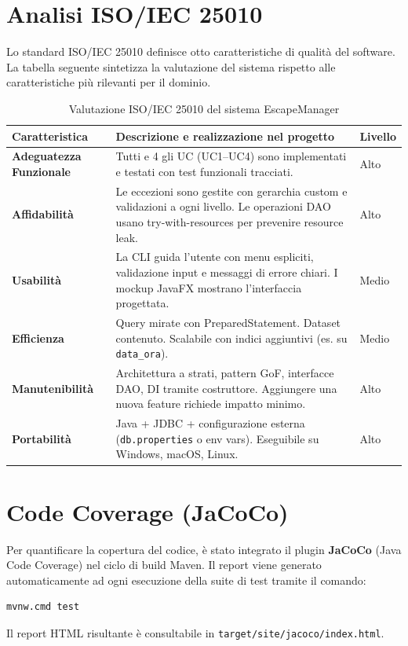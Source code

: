 \section{Analisi ISO/IEC 25010}
Lo standard ISO/IEC 25010 definisce otto caratteristiche di qualità del software. La tabella seguente sintetizza la valutazione del sistema rispetto alle caratteristiche più rilevanti per il dominio.

\begin{table}[H]
    \centering
    \small
    \renewcommand{\arraystretch}{1.3}
    \begin{tabularx}{\textwidth}{|>{\bfseries}l|X|>{\centering\arraybackslash}p{2cm}|}
        \hline
        Caratteristica & Descrizione e realizzazione nel progetto & Livello \\
        \hline
        Adeguatezza Funzionale & Tutti e 4 gli UC (UC1--UC4) sono implementati e testati con test funzionali tracciati. & Alto \\
        \hline
        Affidabilità & Le eccezioni sono gestite con gerarchia custom e validazioni a ogni livello. Le operazioni DAO usano try-with-resources per prevenire resource leak. & Alto \\
        \hline
        Usabilità & La CLI guida l'utente con menu espliciti, validazione input e messaggi di errore chiari. I mockup JavaFX mostrano l'interfaccia progettata. & Medio \\
        \hline
        Efficienza & Query mirate con PreparedStatement. Dataset contenuto. Scalabile con indici aggiuntivi (es. su \texttt{data\_ora}). & Medio \\
        \hline
        Manutenibilità & Architettura a strati, pattern GoF, interfacce DAO, DI tramite costruttore. Aggiungere una nuova feature richiede impatto minimo. & Alto \\
        \hline
        Portabilità & Java + JDBC + configurazione esterna (\texttt{db.properties} o env vars). Eseguibile su Windows, macOS, Linux. & Alto \\
        \hline
    \end{tabularx}
    \caption{Valutazione ISO/IEC 25010 del sistema EscapeManager}
    \label{tab:iso25010}
\end{table}

\section{Code Coverage (JaCoCo)}

Per quantificare la copertura del codice, è stato integrato il plugin \textbf{JaCoCo} (Java Code Coverage) nel ciclo di build Maven. Il report viene generato automaticamente ad ogni esecuzione della suite di test tramite il comando:
\begin{verbatim}
mvnw.cmd test
\end{verbatim}
Il report HTML risultante è consultabile in \texttt{target/site/jacoco/index.html}.


